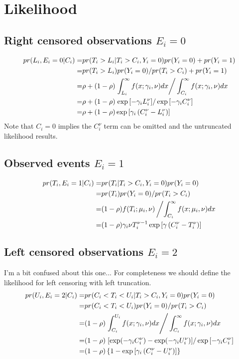 \documentclass{article}
\begin{document}
\section{Likelihood}

\subsection{Right censored observations $E_i =0$}

\begin{align*}
pr(L_i, E_i=0 | C_i) =& pr(T_i > L_i | T_i > C_i, Y_i =0) pr(Y_i =0)  + pr(Y_i =1)\\
=&pr(T_i > L_i) pr(Y_i = 0)/pr(T_i > C_i) + pr(Y_i =1)\\
=& \rho + (1-\rho) \left. \int_{L_i}^\infty f(x;\gamma_i, \nu) dx \right/\int_{C_i}^\infty f(x;\gamma_i, \nu) dx  \\
= &  \rho + (1-\rho) \left. \exp\left[-\gamma_i L_i^\nu\right] \right/\exp\left[-\gamma_i C_i^\nu\right]\\
= &  \rho + (1-\rho) \exp\left[\gamma_i\left(C_i^\nu -L_i^\nu\right)\right] \\
\end{align*}
Note that $C_i=0$ implies the $C_i^\nu$ term can be omitted and the untruncated likelihood results.

\subsection{Observed events $E_i =1$}
\begin{align*}
pr(T_i, E_i=1 | C_i) =& pr(T_i  | T_i > C_i, Y_i =0)  pr(Y_i = 0) 
\\
=& 
 pr(T_i ) pr(Y_i = 0) /pr(T_i > C_i) \\
=&
 (1-\rho) f(T_i ; \mu_i, \nu) \left/ \int_{C_i}^\infty f(x;\mu_i, \nu) dx  \right.\\
=&
 (1-\rho) \gamma_i\nu T_i^{\nu-1} \exp\left[\gamma\left(C_i^\nu-T_i^\nu\right)\right]
\end{align*}

\subsection{Left censored observations $E_i =2$}
I'm a bit confused about this one...  For completeness we should define the likelihood for left censoring with left truncation.
\begin{align*}
pr(U_i, E_i=2 | C_i) =& pr(C_i < T_i < U_i | T_i > C_i, Y_i =0) pr(Y_i =0) \\
=&pr(C_i < T_i <U_i) pr(Y_i = 0)/pr(T_i > C_i) \\
=& (1-\rho) \left. \int_{C_i}^{U_i} f(x;\gamma_i, \nu) dx \right/\int_{C_i}^\infty f(x;\gamma_i, \nu) dx  \\
= &    (1-\rho) \left. \left[\exp(-\gamma_i C_i^\nu) - \exp(-\gamma_i U_i^\nu) \right] \right/\exp\left[-\gamma_i C_i^\nu\right]\\
= &  (1-\rho)\left\{1 -  \exp\left[\gamma_i\left(C_i^\nu -U_i^\nu\right)\right] \right\} \\
\end{align*}
\end{document}
